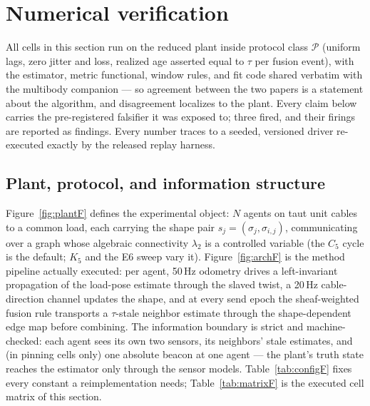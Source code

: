 \section{Numerical verification}\label{sec:numerics}

All cells in this section run on the reduced plant inside protocol class
$\mathcal{P}$ (uniform lags, zero jitter and loss, realized age asserted equal
to $\tau$ per fusion event), with the estimator, metric functional, window
rules, and fit code shared verbatim with the multibody companion --- so
agreement between the two papers is a statement about the algorithm, and
disagreement localizes to the plant. Every claim below carries the pre-registered
falsifier it was exposed to; three fired, and their firings are reported as
findings. Every number traces to a seeded, versioned driver re-executed
exactly by the released replay harness.

\subsection{Plant, protocol, and information structure}
Figure~\ref{fig:plantF} defines the experimental object: $N$ agents on taut
unit cables to a common load, each carrying the shape pair
$s_j = (\sigma_j, \sigma_{i,j})$, communicating over a graph whose algebraic
connectivity $\lambda_2$ is a controlled variable (the $C_5$ cycle is the
default; $K_5$ and the E6 sweep vary it). Figure~\ref{fig:archF} is the
method pipeline actually executed: per agent, 50\,Hz odometry drives a
left-invariant propagation of the load-pose estimate through the slaved twist,
a 20\,Hz cable-direction channel updates the shape, and at every send epoch
the sheaf-weighted fusion rule transports a $\tau$-stale neighbor estimate
through the shape-dependent edge map before combining. The information
boundary is strict and machine-checked: each agent sees its own two sensors,
its neighbors' stale estimates, and (in pinning cells only) one absolute
beacon at one agent --- the plant's truth state reaches the estimator only
through the sensor models. Table~\ref{tab:configF} fixes every constant a
reimplementation needs; Table~\ref{tab:matrixF} is the executed cell matrix
of this section.

